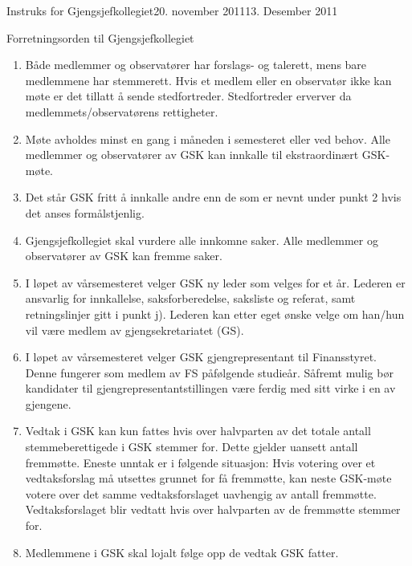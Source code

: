 \begin{instruks}{Instruks for Gjengsjefkollegiet}{20. november 2011}{13. Desember 2011}
    \begin{instruksledd}{Forretningsorden til Gjengsjefkollegiet}
        \begin{enumerate}
            \item Både medlemmer og observatører har forslags- og talerett, mens bare medlemmene
                har stemmerett. Hvis et
                medlem eller en observatør ikke kan møte er det tillatt å sende stedfortreder.
                Stedfortreder erverver da
                medlemmets/observatørens rettigheter.
            \item Møte avholdes minst en gang i måneden i semesteret eller ved behov. Alle
                medlemmer og observatører av
                GSK kan innkalle til ekstraordinært GSK-møte.
            \item Det står GSK fritt å innkalle andre enn de som er nevnt under punkt 2 hvis det
                anses formålstjenlig.
            \item Gjengsjefkollegiet skal vurdere alle innkomne saker. Alle medlemmer og
                observatører av GSK kan fremme
                saker.
            \item I løpet av vårsemesteret velger GSK ny leder som velges for et år. Lederen er
                ansvarlig for innkallelse,
                saksforberedelse, saksliste og referat, samt retningslinjer gitt i punkt j).
                Lederen kan etter eget ønske velge
                om han/hun vil være medlem av gjengsekretariatet (GS).
            \item
                I løpet av vårsemesteret velger GSK gjengrepresentant til Finansstyret. Denne
                fungerer som medlem av FS
                påfølgende studieår. Såfremt mulig bør kandidater til gjengrepresentantstillingen
                være ferdig med sitt virke i
                en av gjengene.
            \item Vedtak i GSK kan kun fattes hvis over halvparten av det totale antall
                stemmeberettigede i GSK stemmer for.
                Dette gjelder uansett antall fremmøtte. Eneste unntak er i følgende situasjon:
                Hvis votering over et
                vedtaksforslag må utsettes grunnet for få fremmøtte, kan neste GSK-møte votere
                over det samme
                vedtaksforslaget uavhengig av antall fremmøtte. Vedtaksforslaget blir vedtatt hvis
                over halvparten av de
                fremmøtte stemmer for.
            \item Medlemmene i GSK skal lojalt følge opp de vedtak GSK fatter.

\end{enumerate}
\end{instruksledd}
\end{instruks}
